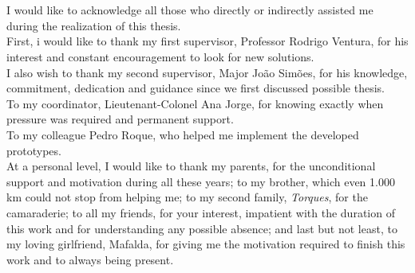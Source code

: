 
\section*{\acknowledgments}


I would like to acknowledge all those who directly or indirectly assisted me during the realization of this thesis.\\

First, i would like to thank my first supervisor, Professor Rodrigo Ventura, for his interest and constant encouragement to look for new solutions.\\

I also wish to thank my second supervisor, Major Jo\~{a}o Sim\~{o}es, for his knowledge, commitment, dedication and guidance since we first discussed possible thesis. \\

To my coordinator, Lieutenant-Colonel Ana Jorge, for knowing exactly when pressure was required and permanent support.\\

To my colleague Pedro Roque, who helped me implement the developed prototypes.\\

At a personal level, I would like to thank my parents, for the unconditional support and motivation during all these years; to my brother, which even 1.000 km could not stop from helping me; to my second family, \textit{Torques}, for the camaraderie; to all my friends, for your interest, impatient with the duration of this work and for understanding any possible absence; and last but not least, to my loving girlfriend, Mafalda, for giving me the motivation required to finish this work and to always being present.\\

\cleardoublepage

